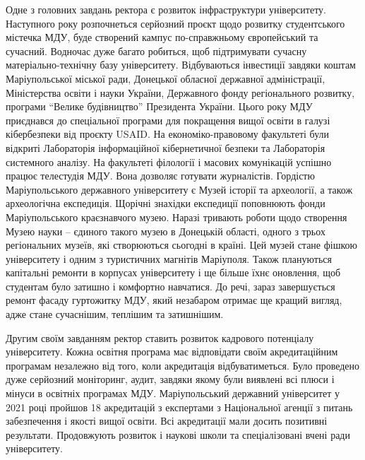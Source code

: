 
Одне з головних завдань ректора є розвиток інфраструктури університету.
Наступного року розпочнеться серйозний проєкт щодо розвитку студентського
містечка МДУ, буде створений кампус по-справжньому європейський та сучасний.
Водночас дуже багато робиться, щоб підтримувати сучасну матеріально-технічну
базу університету. Відбуваються інвестиції завдяки коштам Маріупольської
міської ради, Донецької обласної державної адміністрації, Міністерства освіти і
науки України, Державного фонду регіонального розвитку, програми \enquote{Велике
будівництво} Президента України. Цього року МДУ приєднався до спеціальної
програми для покращення вищої освіти в галузі кібербезпеки від проєкту USAID.
На економіко-правовому факультеті були відкриті Лабораторія інформаційної
кібернетичної безпеки та Лабораторія системного аналізу. На факультеті
філології і масових комунікацій успішно працює телестудія МДУ. Вона дозволяє
готувати журналістів. Гордістю Маріупольського державного університету є Музей
історії та археології, а також археологічна експедиція. Щорічні знахідки
експедиції поповнюють фонди Маріупольського краєзнавчого музею. Наразі тривають
роботи щодо створення Музею науки – єдиного такого музею в Донецькій області,
одного з трьох регіональних музеїв, які створюються сьогодні в країні. Цей
музей стане фішкою університету і одним з туристичних магнітів Маріуполя. Також
плануються капітальні ремонти в корпусах університету і ще більше їхнє
оновлення, щоб студентам було затишно і комфортно навчатися. До речі, зараз
завершується ремонт фасаду гуртожитку МДУ, який незабаром отримає ще кращий
вигляд, адже стане сучаснішим, теплішим та затишнішим.


Другим своїм завданням ректор ставить розвиток кадрового потенціалу
університету. Кожна освітня програма має відповідати своїм акредитаційним
програмам незалежно від того, коли акредитація відбуватиметься. Було проведено
дуже серйозний моніторинг, аудит, завдяки якому були виявлені всі плюси і
мінуси в освітніх програмах МДУ. Маріупольський державний університет у 2021
році пройшов 18 акредитацій з експертами з Національної агенції з питань
забезпечення і якості вищої освіти. Всі акредитації мали досить позитивні
результати. Продовжують розвиток і наукові школи та спеціалізовані вчені ради
університету.


